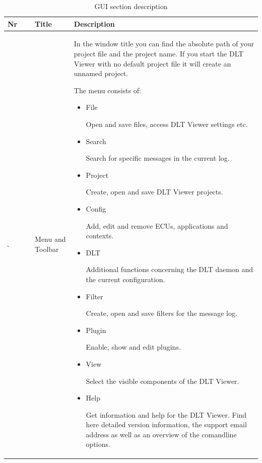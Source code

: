 \documentclass[a4paper,11pt]{article}
\begin{document}
\pagebreak

\begin{longtable}{| l | m{3cm}  | m{11cm} |}
\caption[GUI section description]{GUI section description} \label{guisectiondescription} \\
 \hline
   \textbf{Nr} & \textbf{Title} & \textbf{Description} \\
\hline
   \includegraphics[width=0.05\textwidth]{images/Mark1.png}
   &
    Menu and Toolbar
   &
   In the window title you can find the absolute path of your project file 
   and the project name. If you start the DLT Viewer
   with no default project file it will
   create an unnamed project.

   The menu consists of:

\begin{itemize}
    \item \begin{bf}File\end{bf}
     Open and save files, access DLT Viewer settings etc.
    \item \begin{bf}Search\end{bf}
     Search for specific messages in the current log.
    \item \begin{bf}Project\end{bf}
      Create, open and save DLT Viewer projects.
    \item \begin{bf}Config\end{bf}
     Add, edit and remove ECUs, applications and contexts.
    \item \begin{bf}DLT\end{bf}
      Additional functions concerning the DLT daemon and the current configuration.
    \item \begin{bf}Filter\end{bf}
       Create, open and save filters for the message log.
    \item \begin{bf}Plugin\end{bf}
     Enable, show and edit plugins.
    \item \begin{bf}View\end{bf}
     Select the visible components of the DLT Viewer.
    \item \begin{bf}Help\end{bf}
    Get information and help for the DLT Viewer. Find here detailed version information, the support email address as well as
    an overview of the comandline options.
 \end{itemize}


\end{longtable}
\end{document}
